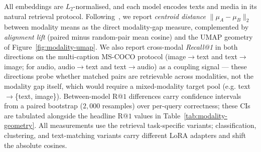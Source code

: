 All embeddings are $L_2$-normalised, and each model encodes texts and media in its natural retrieval protocol.
Following~\cite{modality-gap}, we report \emph{centroid distance} $\lVert\mu_A - \mu_B\rVert_2$ between modality means as the direct modality-gap measure, complemented by \emph{alignment lift} (paired minus random-pair mean cosine) and the UMAP geometry of Figure~\ref{fig:modality-umap}.
We also report cross-modal \emph{Recall@1} in both directions on the multi-caption MS-COCO protocol (image$\rightarrow$text and text$\rightarrow$image; for audio, audio$\rightarrow$text and text$\rightarrow$audio) as a coupling signal --- these directions probe whether matched pairs are retrievable across modalities, not the modality gap itself, which would require a mixed-modality target pool (e.g. text$\rightarrow$\{text, image\}).
Between-model R@$1$ differences carry confidence intervals from a paired bootstrap ($2{,}000$ resamples) over per-query correctness; these CIs are tabulated alongside the headline R@$1$ values in Table~\ref{tab:modality-geometry}.
All measurements use the retrieval task-specific variants; classification, clustering, and text-matching variants carry different LoRA adapters and shift the absolute cosines.

